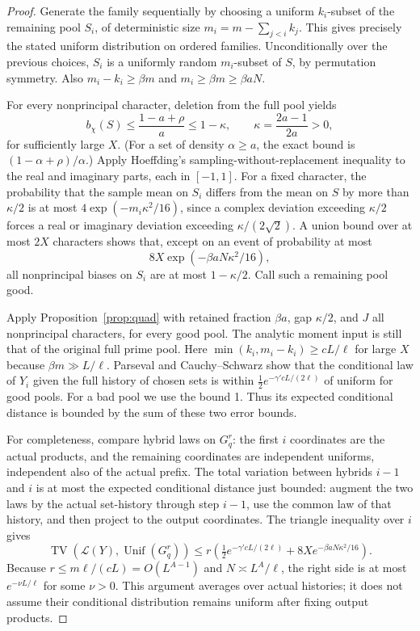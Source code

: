 \documentclass[11pt]{article}
\theoremstyle{remark}\newtheorem{remark}[theorem]{Remark}
\newcommand{\TV}{\operatorname{TV}}\newcommand{\abs}[1]{\lvert#1\rvert}
\begin{document}
\begin{proof}
Generate the family sequentially by choosing a uniform $k_i$-subset of the remaining pool $S_i$, of deterministic size $m_i=m-\sum_{j<i}k_j$. This gives precisely the stated uniform distribution on ordered families. Unconditionally over the previous choices, $S_i$ is a uniformly random $m_i$-subset of $S$, by permutation symmetry. Also $m_i-k_i\ge\beta m$ and $m_i\ge\beta m\ge\beta aN$.

For every nonprincipal character, deletion from the full pool yields
\[
 b_\chi(S)\le\frac{1-a+\rho}{a}\le1-\kappa,
 \qquad \kappa=\frac{2a-1}{2a}>0,
\]
for sufficiently large $X$. (For a set of density $\alpha\ge a$, the exact bound is $(1-\alpha+\rho)/\alpha$.) Apply Hoeffding's sampling-without-replacement inequality \cite[Sec.~6]{hoeffding} to the real and imaginary parts, each in $[-1,1]$. For a fixed character, the probability that the sample mean on $S_i$ differs from the mean on $S$ by more than $\kappa/2$ is at most $4\exp(-m_i\kappa^2/16)$, since a complex deviation exceeding $\kappa/2$ forces a real or imaginary deviation exceeding $\kappa/(2\sqrt2)$. A union bound over at most $2X$ characters shows that, except on an event of probability at most
\[
 8X\exp(-\beta aN\kappa^2/16),
\]
all nonprincipal biases on $S_i$ are at most $1-\kappa/2$. Call such a remaining pool good.

Apply Proposition~\ref{prop:quad} with retained fraction $\beta a$, gap $\kappa/2$, and $J$ all nonprincipal characters, for every good pool. The analytic moment input is still that of the original full prime pool. Here $\min(k_i,m_i-k_i)\ge cL/\ell$ for large $X$ because $\beta m\gg L/\ell$. Parseval and Cauchy--Schwarz show that the conditional law of $Y_i$ given the full history of chosen sets is within $\tfrac12e^{-\gamma' cL/(2\ell)}$ of uniform for good pools. For a bad pool we use the bound 1. Thus its expected conditional distance is bounded by the sum of these two error bounds.

For completeness, compare hybrid laws on $G_q^r$: the first $i$ coordinates are the actual products, and the remaining coordinates are independent uniforms, independent also of the actual prefix. The total variation between hybrids $i-1$ and $i$ is at most the expected conditional distance just bounded: augment the two laws by the actual set-history through step $i-1$, use the common law of that history, and then project to the output coordinates. The triangle inequality over $i$ gives
\[
 \TV(\mathcal L(Y),\operatorname{Unif}(G_q^r))\le
 r\left(\tfrac12e^{-\gamma' c L/(2\ell)}+8X e^{-\beta aN\kappa^2/16}\right).
\]
Because $r\le m\ell/(cL)=O(L^{A-1})$ and $N\asymp L^A/\ell$, the right side is at most $e^{-\nu L/\ell}$ for some $\nu>0$. This argument averages over actual histories; it does not assume their conditional distribution remains uniform after fixing output products.


\end{proof}
\end{document}
